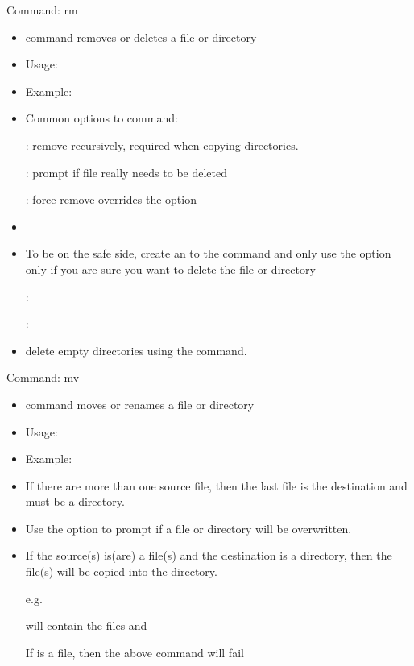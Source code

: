 \documentclass[10pt,t]{beamer}
\begin{document}
\begin{frame}[fragile]{Command: rm}
  \begin{itemize}
    \item {} command removes or deletes a file or directory
    \item Usage: 
    \item Example: 
    \item Common options to  command:
    \item[] : remove recursively, required when copying directories.
    \item[] : prompt if file really needs to be deleted
    \item[] : force remove overrides the  option
    \item {}
    \item To be on the safe side, create an  to the  command and only use the  option only if you are sure you want to delete the file or directory
    \item[] : 
    \item[]    : 
    \item delete empty directories using the  command.
  \end{itemize}
\end{frame}

\begin{frame}[fragile]{Command: mv}
  \begin{itemize}
    \item {} command moves or renames a file or directory
    \item Usage: 
    \item Example: 
    \item If there are more than one source file, then the last file is the destination and must be a directory.
    \item Use the  option to prompt if a file or directory will be overwritten.
    \item If the source(s) is(are) a file(s) and the destination is a directory, then the file(s) will be copied into the directory.
    \item[e.g.]
    \item[]  will contain the files  and 
    \item[] If  is a file, then the above command will fail
  \end{itemize}
\end{frame}
\end{document}
